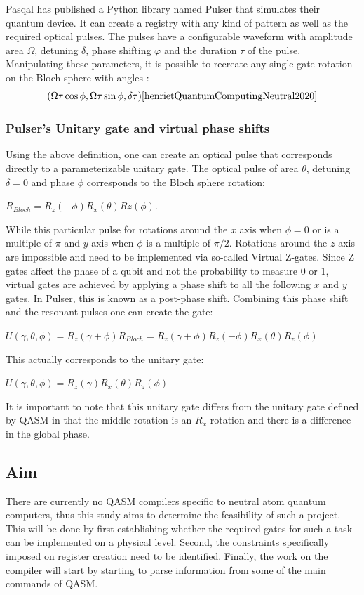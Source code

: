 Pasqal has published a Python library named Pulser that simulates their quantum device. It can create a registry with any kind of pattern as well as the required optical pulses.
The pulses have a configurable waveform with amplitude area $\Omega$, detuning $\delta$, phase shifting $\varphi$ and the duration $\tau$ of the pulse. Manipulating these parameters, it is possible to recreate any single-gate rotation on the
 Bloch sphere with angles :
 $$(\Omega\tau\cos\phi,\Omega\tau\sin\phi,\delta\tau)\cite{henrietQuantumComputingNeutral2020}$$
 
 \subsubsection{Pulser's Unitary gate and virtual phase shifts}
Using the above definition, one can create an optical pulse that corresponds directly to a parameterizable unitary gate.
The optical pulse of area $\theta$, detuning $\delta = 0$ and phase $\phi$ corresponds to the Bloch sphere rotation:
\begin{center}
  $R_{Bloch} = R_z(-\phi)R_x(\theta)Rz(\phi)$.\cite{henrietQuantumComputingNeutral2020}
\end{center}
 While this particular pulse for rotations around the $x$ axis when $\phi = 0$ or is a multiple of $\pi$ and $y$ axis when $\phi$ is a multiple of $\pi/2$.
Rotations around the $z$ axis are impossible and need to be implemented via so-called Virtual Z-gates. Since Z gates affect the phase of a qubit and not the probability to measure 0 or 1, virtual 
gates are achieved by applying a phase shift to all the following $x$ and $y$ gates. In Pulser, this is known as a post-phase shift.
Combining this phase shift and the resonant pulses one can create  the gate:
\begin{center}
  $U(\gamma,\theta,\phi) = R_z(\gamma + \phi)R_{Bloch} =  R_z(\gamma + \phi)R_z(-\phi)R_x(\theta)R_z(\phi)$\cite{henrietQuantumComputingNeutral2020}
\end{center}
This actually corresponds to the unitary gate:
\begin{center}
  $U(\gamma,\theta,\phi) = R_z(\gamma)R_x(\theta)R_z(\phi)$\cite{henrietQuantumComputingNeutral2020}
\end{center}
 
It is important to note that this unitary gate differs from the unitary gate defined by QASM in that the middle rotation is an $R_x$ rotation and there is a difference in the global phase.


\subsection{Aim}
There are currently no QASM compilers specific to neutral atom quantum computers, thus this study aims to determine the feasibility of such a project.
This will be done by first establishing whether the required gates for such a task can be implemented on a physical level. Second, the constraints
specifically imposed on register creation need to be identified. Finally, the work on the compiler will start by starting to parse information 
from some of the main commands of QASM. 